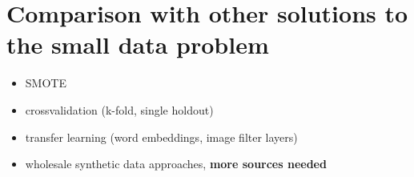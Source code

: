 \chapter{Comparison with other solutions to the small data problem}


\begin{itemize}
	\item \ac{SMOTE}
	\item crossvalidation (k-fold, single holdout)
	\item transfer learning (word embeddings, image filter layers)
	\item wholesale synthetic data approaches, \cite{10.1145/3339252.3339281}  \textbf{more sources needed}
\end{itemize}

